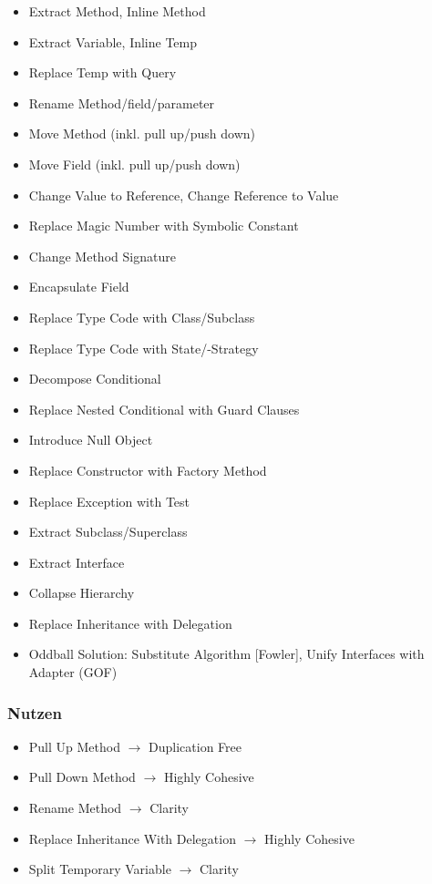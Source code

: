 \begin{multicols}{2}
	\begin{itemize}
		\item Extract Method, Inline Method
		\item Extract Variable, Inline Temp
		\item Replace Temp with Query
		\item Rename Method/field/parameter
		\item Move Method (inkl. pull up/push down)
		\item Move Field (inkl. pull up/push down)
		\item Change Value to Reference, Change Reference to Value
		\item Replace Magic Number with Symbolic Constant
		\item Change Method Signature
		\item Encapsulate Field
		\item Replace Type Code with Class/Subclass
		\item Replace Type Code with State/-Strategy
		\item Decompose Conditional
		\item Replace Nested Conditional with Guard Clauses
		\item Introduce Null Object
		\item Replace Constructor with Factory Method
		\item Replace Exception with Test
		\item Extract Subclass/Superclass
		\item Extract Interface
		\item Collapse Hierarchy
		\item Replace Inheritance with Delegation
		\item Oddball Solution: Substitute Algorithm [Fowler], Unify Interfaces with Adapter (GOF)
	\end{itemize}
\end{multicols}

\subsubsection{Nutzen}
\begin{itemize}
	\item Pull Up Method $\rightarrow$ Duplication Free
	\item Pull Down Method $\rightarrow$ Highly Cohesive
	\item Rename Method $\rightarrow$ Clarity
	\item Replace Inheritance With Delegation $\rightarrow$ Highly Cohesive
	\item Split Temporary Variable $\rightarrow$ Clarity
\end{itemize}

